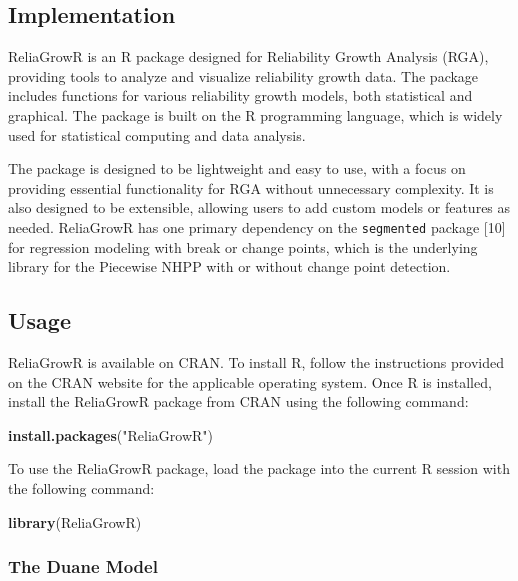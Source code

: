\documentclass[
]{article}
\newenvironment{Shaded}{\begin{snugshade}}{\end{snugshade}}
\newcommand{\FunctionTok}[1]{\textcolor[rgb]{0.13,0.29,0.53}{\textbf{#1}}}
\newcommand{\NormalTok}[1]{#1}
\newcommand{\StringTok}[1]{\textcolor[rgb]{0.31,0.60,0.02}{#1}}
\begin{document}
\subsection{Implementation}\label{implementation}

ReliaGrowR is an R package designed for Reliability Growth Analysis
(RGA), providing tools to analyze and visualize reliability growth data.
The package includes functions for various reliability growth models,
both statistical and graphical. The package is built on the R
programming language, which is widely used for statistical computing and
data analysis.

The package is designed to be lightweight and easy to use, with a focus
on providing essential functionality for RGA without unnecessary
complexity. It is also designed to be extensible, allowing users to add
custom models or features as needed. ReliaGrowR has one primary
dependency on the \texttt{segmented} package {[}10{]} for regression
modeling with break or change points, which is the underlying library
for the Piecewise NHPP with or without change point detection.

\subsection{Usage}\label{usage}

ReliaGrowR is available on CRAN. To install R, follow the instructions
provided on the CRAN website for the applicable operating system. Once R
is installed, install the ReliaGrowR package from CRAN using the
following command:

\begin{Shaded}
\begin{Highlighting}[]
\FunctionTok{install.packages}\NormalTok{(}\StringTok{"ReliaGrowR"}\NormalTok{)}
\end{Highlighting}
\end{Shaded}

To use the ReliaGrowR package, load the package into the current R
session with the following command:

\begin{Shaded}
\begin{Highlighting}[]
\FunctionTok{library}\NormalTok{(ReliaGrowR)}
\end{Highlighting}
\end{Shaded}

\subsubsection{The Duane Model}\label{the-duane-model}
\end{document}
